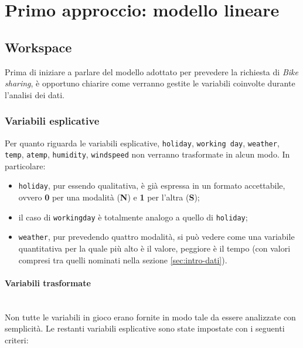 \section{Primo approccio: modello lineare}

\subsection{Workspace}

Prima di iniziare a parlare del modello adottato per prevedere la richiesta di
\emph{Bike sharing}, è opportuno chiarire come verranno gestite le variabili
coinvolte durante l'analisi dei dati.

\subsubsection{Variabili esplicative}
Per quanto riguarda le variabili esplicative, \texttt{holiday},
\texttt{working day}, \texttt{weather}, \texttt{temp}, \texttt{atemp},
\texttt{humidity}, \texttt{windspeed} non verranno trasformate in alcun modo.
In particolare:

\begin{itemize}
\item \texttt{holiday}, pur essendo qualitativa, è già espressa in un formato
  accettabile, ovvero \textbf{0} per una modalità (\textbf{N}) e \textbf{1}
  per l'altra (\textbf{S});
\item il caso di \texttt{workingday} è totalmente analogo a quello di
  \texttt{holiday};
\item \texttt{weather}, pur prevedendo quattro modalità, si può vedere come
  una variabile quantitativa per la quale più alto è il valore, peggiore è il
  tempo (con valori compresi tra quelli nominati nella sezione
  \ref{sec:intro-dati}).
\end{itemize}

\paragraph{Variabili trasformate} \mbox{}\\
Non tutte le variabili in gioco erano fornite in modo tale da essere
analizzate con semplicità.
Le restanti variabili esplicative sono state impostate con i seguenti criteri:

